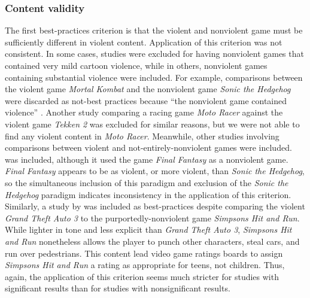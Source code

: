 \documentclass[man]{apa6}
\begin{document}
\subsubsection{Content validity}
The first best-practices criterion is that the violent and nonviolent game must be sufficiently different in violent content. Application of this criterion was not consistent. In some cases, studies were excluded for having nonviolent games that contained very mild cartoon violence, while in others, nonviolent games containing substantial violence were included. For example, comparisons between the violent game {\em Mortal Kombat} and the nonviolent game {\em Sonic the Hedgehog} were discarded as not-best practices \citep[e.g.,][]{Cohn:1995; Hoffman:1994} because ``the nonviolent game contained violence'' \citep[supplementary materials]{Anderson:etal:2010}. Another study comparing a racing game {\em Moto Racer} against the violent game {\em Tekken 2} \citep{Brooks:2000} was excluded for similar reasons, but we were not able to find any violent content in {\em Moto Racer}. Meanwhile, other studies involving comparisons between violent and not-entirely-nonviolent games were included. \citet{Konijn:etal:2007} was included, although it used the game {\em Final Fantasy} as a nonviolent game. {\em Final Fantasy} appears to be as violent, or more violent, than {\em Sonic the Hedgehog}, so the simultaneous inclusion of this paradigm and exclusion of the {\em Sonic the Hedgehog} paradigm indicates inconsistency in the application of this criterion. Similarly, a study by \citet{Brady:Mathews:2006} was included as best-practices despite comparing the violent {\em Grand Theft Auto 3} to the purportedly-nonviolent game {\em Simpsons Hit and Run}. While lighter in tone and less explicit than {\em Grand Theft Auto 3}, {\em Simpsons Hit and Run} nonetheless allows the player to punch other characters, steal cars, and run over pedestrians. This content lead video game ratings boards to assign {\em Simpsons Hit and Run} a rating as appropriate for teens, not children. Thus, again, the application of this criterion seems much stricter for studies with significant results than for studies with nonsignificant results.
\end{document}
